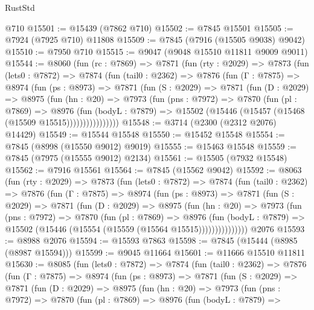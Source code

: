 \begin{lexlean}{RustStd}
\begin{coremodule}
    @710
@15501 := @15439 (@7862 @710)
@15502 := @7845 @15501
@15505 := @7924 (@7925 @710) @11808
@15509 := @7845 (@7916 (@15505 @9038) @9042)
@15510 := @7950 @710
@15515 := @9047 (@9048 @15510 @11811 @9009 @9011)
@15544 := @8060
    (fun (rc : @7869) =>
    @7871
      (fun (rty : @2029) =>
      @7873
        (fun (lets0 : @7872) =>
        @7874
          (fun (tail0 : @2362) =>
          @7876
            (fun (Γ : @7875) =>
            @8974
              (fun (ps : @8973) =>
              @7871
                (fun (S : @2029) =>
                @7871
                  (fun (D : @2029) =>
                  @8975
                    (fun (hn : @20) =>
                    @7973
                      (fun (pns : @7972) =>
                      @7870
                        (fun (pl : @7869) =>
                        @8976
                          (fun (bodyL : @7879) =>
                          @15502 (@15446 (@15457 (@15468 (@15509 @15515))))))))))))))))
@15548 := @3714 (@2300 (@2312 @2076) @14429)
@15549 := @15544 @15548
@15550 := @15452 @15548
@15554 := @7845 (@8998 (@15550 @9012) @9019)
@15555 := @15463 @15548
@15559 := @7845 (@7975 (@15555 @9012) @2134)
@15561 := @15505 (@7932 @15548)
@15562 := @7916 @15561
@15564 := @7845 (@15562 @9042)
@15592 := @8063
    (fun (rty : @2029) =>
    @7873
      (fun (lets0 : @7872) =>
      @7874
        (fun (tail0 : @2362) =>
        @7876
          (fun (Γ : @7875) =>
          @8974
            (fun (ps : @8973) =>
            @7871
              (fun (S : @2029) =>
              @7871
                (fun (D : @2029) =>
                @8975
                  (fun (hn : @20) =>
                  @7973
                    (fun (pns : @7972) =>
                    @7870
                      (fun (pl : @7869) =>
                      @8976
                        (fun (bodyL : @7879) =>
                        @15502 (@15446 (@15554 (@15559 (@15564 @15515)))))))))))))))
    @2076
@15593 := @8988 @2076
@15594 := @15593 @7863
@15598 := @7845 (@15444 (@8985 (@8987 @15594)))
@15599 := @9045 @11664
@15601 := @11666 @15510 @11811
@15630 := @8085
    (fun (lets0 : @7872) =>
    @7874
      (fun (tail0 : @2362) =>
      @7876
        (fun (Γ : @7875) =>
        @8974
          (fun (ps : @8973) =>
          @7871
            (fun (S : @2029) =>
            @7871
              (fun (D : @2029) =>
              @8975
                (fun (hn : @20) =>
                @7973
                  (fun (pns : @7972) =>
                  @7870
                    (fun (pl : @7869) =>
                    @8976
                      (fun (bodyL : @7879) =>

\end{coremodule}
\end{lexlean}
